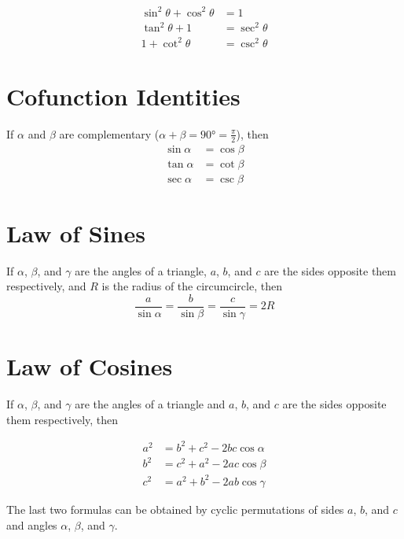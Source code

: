 \documentclass{article}
\begin{document}
        \begin{align}
                \sin^2 \theta + \cos^2 \theta &= 1\\
                \tan^2 \theta + 1 &= \sec^2 \theta\\
                1 + \cot^2 \theta &= \csc^2 \theta
        \end{align}
                
        \section{Cofunction Identities}

        If $\alpha$ and $\beta$ are complementary ($\alpha + \beta = \ang{90} = \frac{\pi}{2}$), then
        \begin{align}
                \sin \alpha &= \cos \beta\\
                \tan \alpha &= \cot \beta\\
                \sec \alpha &= \csc \beta
        \end{align}

        \section{Law of Sines}

        If $\alpha$, $\beta$, and $\gamma$ are the angles of a triangle, $a$, $b$, and $c$ are the sides opposite them respectively, and $R$ is the radius of the circumcircle, then
        \[
                \frac{a}{\sin \alpha} = \frac{b}{\sin \beta} = \frac{c}{\sin \gamma} = 2R
        \]

        \section{Law of Cosines}

        If $\alpha$, $\beta$, and $\gamma$ are the angles of a triangle and $a$, $b$, and $c$ are the sides opposite them respectively, then

        \begin{align}
                a^2 &= b^2 + c^2 - 2bc \cos \alpha\\
                b^2 &= c^2 + a^2 - 2ac \cos \beta\\
                c^2 &= a^2 + b^2 - 2ab \cos \gamma
        \end{align}

        The last two formulas can be obtained by cyclic permutations of sides $a$, $b$, and $c$ and angles $\alpha$, $\beta$, and $\gamma$.
\end{document}
